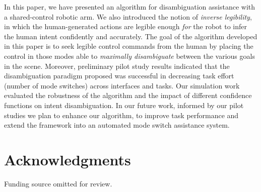 \documentclass[conference]{IEEEtran}
\begin{document}
In this paper, we have presented an algorithm for disambiguation assistance with a shared-control robotic arm. We also introduced the notion of \textit{inverse legibility}, in which the human-generated actions are legible enough \textit{for} the robot to infer the human intent confidently and accurately. The goal of the algorithm developed in this paper is to seek legible control commands from the human by placing the control in those modes able to \textit{maximally disambiguate} between the various goals in the scene.  Moreover, preliminary pilot study results indicated that the disambiguation paradigm proposed was successful in decreasing task effort (number of mode switches) across interfaces and tasks. Our simulation work evaluated the robustness of the algorithm and the impact of different confidence functions on intent disambiguation. In our future work, informed by our pilot studies we plan to enhance our algorithm, to improve task performance and extend the framework into an automated mode switch assistance system. 

\section*{Acknowledgments}
Funding source omitted for review. 
%
\end{document}
